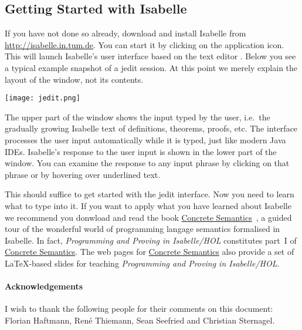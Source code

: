\ifsem
\subsection*{Getting Started with Isabelle}

If you have not done so already, download and install Isabelle
from \url{http://isabelle.in.tum.de}. You can start it by clicking
on the application icon. This will launch Isabelle's
user interface based on the text editor . Below you see
a typical example snapshot of a jedit session. At this point we merely explain
the layout of the window, not its contents.

\begin{center}
\texttt{[image: jedit.png]}
\end{center}
The upper part of the window shows the input typed by the user, i.e.\ the
gradually growing Isabelle text of definitions, theorems, proofs, etc.  The
interface processes the user input automatically while it is typed, just like
modern Java IDEs.  Isabelle's response to the user input is shown in the
lower part of the window. You can examine the response to any input phrase
by clicking on that phrase or by hovering over underlined text.

This should suffice to get started with the jedit interface.
Now you need to learn what to type into it.
\else
If you want to apply what you have learned about Isabelle we recommend you
donwload and read the book
\href{http://www.in.tum.de/~nipkow/Concrete/}{Concrete
Semantics}~\cite{ConcreteSemantics}, a guided tour of the wonderful world of
programming langage semantics formalised in Isabelle.  In fact,
\emph{Programming and Proving in Isabelle/HOL} constitutes part~I of
\href{http://www.in.tum.de/~nipkow/Concrete/}{Concrete Semantics}.  The web
pages for \href{http://www.in.tum.de/~nipkow/Concrete/}{Concrete Semantics}
also provide a set of \LaTeX-based slides for teaching \emph{Programming and
Proving in Isabelle/HOL}.
\fi

\ifsem\else
\paragraph{Acknowledgements}
I wish to thank the following people for their comments on this document:
Florian Haftmann, Ren\'{e} Thiemann, Sean Seefried and Christian Sternagel.
\fi